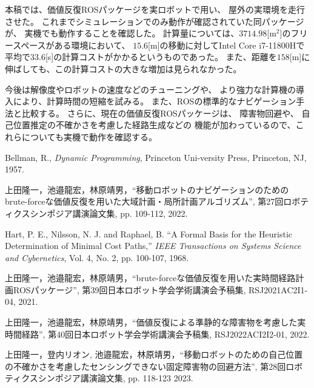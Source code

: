 \documentclass{jarticle}
\begin{document}
本稿では、価値反復ROSパッケージを実ロボットで用い、
屋外の実環境を走行させた。
これまでシミュレーションでのみ動作が確認されていた同パッケージが、
実機でも動作することを確認した。
計算量については、$3714.98$[m$^2$]のフリースペースがある環境において、
$15.6$[m]の移動に対してIntel Core i7-11800Hで
平均で$33.6$[s]の計算コストがかかるというものであった。
また、距離を$158$[m]に伸ばしても、この計算コストの大きな増加は見られなかった。

今後は解像度やロボットの速度などのチューニングや、
より強力な計算機の導入により、計算時間の短縮を試みる。
また、ROSの標準的なナビゲーション手法と比較する。
さらに、現在の価値反復ROSパッケージは、
障害物回避\cite{上田rsj2022}や、
自己位置推定の不確かさを考慮した経路生成\cite{上田robosym2023}などの
機能が加わっているので、これらについても実機で動作を確認する。



\footnotesize
\begin{thebibliography}{99}

	Bellman, R., {\it Dynamic Programming}, Princeton Uni-versity Press, Princeton, NJ, 1957.

	上田隆一，池邉龍宏，林原靖男，``移動ロボットのナビゲーションのためのbrute-forceな価値反復を用いた大域計画・局所計画アルゴリズム'', 
	第27回ロボティクスシンポジア講演論文集, pp. 109-112, 2022.
	
	Hart, P. E., Nilsson, N. J. and Raphael, B. ``A Formal
	Basis for the Heuristic Determination of Minimal Cost
	Paths,'' {\it IEEE Transactions on Systems Science and Cybernetics}, Vol. 4, No. 2, pp. 100-107, 1968.
	
	上田隆一，池邉龍宏，林原靖男，``brute-forceな価値反復を用いた実時間経路計画ROSパッケージ'', 
	第39回日本ロボット学会学術講演会予稿集, RSJ2021AC2I1-04, 2021.

	上田隆一，池邉龍宏，林原靖男，``価値反復による準静的な障害物を考慮した実時間経路'', 
	第40回日本ロボット学会学術講演会予稿集, RSJ2022ACI2I2-01, 2022.

	上田隆一，登内リオン, 池邉龍宏，林原靖男，``移動ロボットのための自己位置の不確かさを考慮したセンシングできない固定障害物の回避方法'', 
	第28回ロボティクスシンポジア講演論文集, pp. 118-123 2023.

\end{thebibliography}

\normalsize
\end{document}
